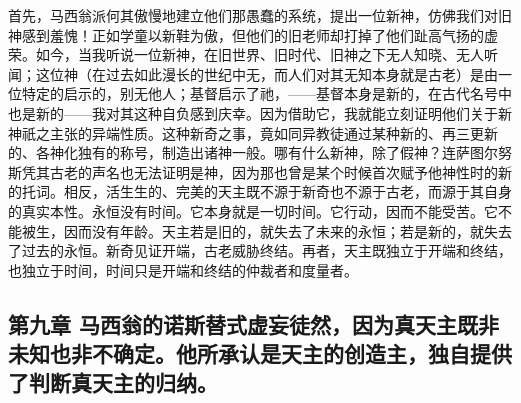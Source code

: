 首先，马西翁派何其傲慢地建立他们那愚蠢的系统，提出一位新神，仿佛我们对旧神感到羞愧！正如学童以新鞋为傲，但他们的旧老师却打掉了他们趾高气扬的虚荣。如今，当我听说一位新神，在旧世界、旧时代、旧神之下无人知晓、无人听闻；这位神（在过去如此漫长的世纪中无，而人们对其无知本身就是古老）是由一位特定的启示的，别无他人；基督启示了祂，——基督本身是新的，在古代名号中也是新的——我对其这种自负感到庆幸。因为借助它，我就能立刻证明他们关于新神祇之主张的异端性质。这种新奇之事，竟如同异教徒通过某种新的、再三更新的、各神化独有的称号，制造出诸神一般。哪有什么新神，除了假神？连萨图尔努斯凭其古老的声名也无法证明是神，因为那也曾是某个时候首次赋予他神性时的新的托词。相反，活生生的、完美的天主既不源于新奇也不源于古老，而源于其自身的真实本性。永恒没有时间。它本身就是一切时间。它行动，因而不能受苦。它不能被生，因而没有年龄。天主若是旧的，就失去了未来的永恒；若是新的，就失去了过去的永恒。新奇见证开端，古老威胁终结。再者，天主既独立于开端和终结，也独立于时间，时间只是开端和终结的仲裁者和度量者。\par


\subsection{第九章 马西翁的诺斯替式虚妄徒然，因为真天主既非未知也非不确定。他所承认是天主的创造主，独自提供了判断真天主的归纳。}

